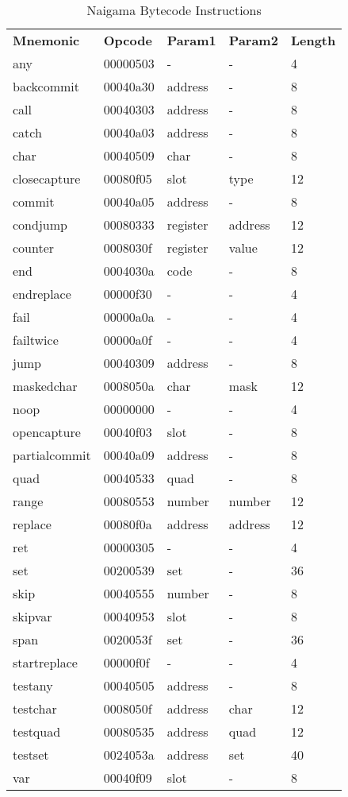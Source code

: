 
\begin{table}[]
\centering
\caption{Naigama Bytecode Instructions}
\label{tab:naig_bytecode}
\begin{tabular}{lllll}
\textbf{Mnemonic} & \textbf{Opcode} & \textbf{Param1} & \textbf{Param2} & \textbf{Length} \\
any & 00000503 & - & -  & 4 \\
backcommit & 00040a30 & address & -  & 8 \\
call & 00040303 & address & -  & 8 \\
catch & 00040a03 & address & -  & 8 \\
char & 00040509 & char & -  & 8 \\
closecapture & 00080f05 & slot & type  & 12 \\
commit & 00040a05 & address & -  & 8 \\
condjump & 00080333 & register & address  & 12 \\
counter & 0008030f & register & value  & 12 \\
end & 0004030a & code & -  & 8 \\
endreplace & 00000f30 & - & -  & 4 \\
fail & 00000a0a & - & -  & 4 \\
failtwice & 00000a0f & - & -  & 4 \\
jump & 00040309 & address & -  & 8 \\
maskedchar & 0008050a & char & mask  & 12 \\
noop & 00000000 & - & -  & 4 \\
opencapture & 00040f03 & slot & -  & 8 \\
partialcommit & 00040a09 & address & -  & 8 \\
quad & 00040533 & quad & -  & 8 \\
range & 00080553 & number & number  & 12 \\
replace & 00080f0a & address & address  & 12 \\
ret & 00000305 & - & -  & 4 \\
set & 00200539 & set & -  & 36 \\
skip & 00040555 & number & -  & 8 \\
skipvar & 00040953 & slot & -  & 8 \\
span & 0020053f & set & -  & 36 \\
startreplace & 00000f0f & - & -  & 4 \\
testany & 00040505 & address & -  & 8 \\
testchar & 0008050f & address & char  & 12 \\
testquad & 00080535 & address & quad  & 12 \\
testset & 0024053a & address & set  & 40 \\
var & 00040f09 & slot & -  & 8 \\
\end{tabular}
\end{table}
